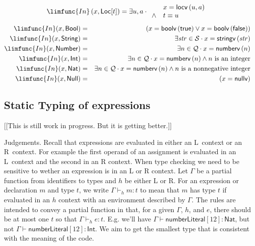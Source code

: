 \documentclass[12pt]{article}
\begin{document}
\begin{equation*}
\limfunc{In}\left( x,\mathsf{Loc}[t]\right) =\exists u,a\cdot 
\begin{array}{ll}
& x=\mathsf{locv}\left( u,a\right) \\ 
\wedge & t\equiv u%
\end{array}%
\end{equation*}%
\begin{eqnarray*}
\limfunc{In}(x,\mathsf{Bool}) &=&\left( x=\mathsf{boolv}\left( \mathsf{true}%
\right) \vee x=\mathsf{boolv}\left( \mathsf{false}\right) \right) \\
\limfunc{In}(x,\mathsf{String}) &=&\exists \mathit{str}\in \mathcal{S}\cdot
x=\mathsf{stringv}\left( \mathit{str}\right) \\
\limfunc{In}(x,\mathsf{Number}) &=&\exists n\in \mathcal{Q}\cdot x=\mathsf{%
numberv}\left( n\right) \\
\limfunc{In}(x,\mathsf{Int}) &=&\exists n\in \mathcal{Q}\cdot x=\mathsf{%
numberv}\left( n\right) \wedge n\text{ is an integer} \\
\limfunc{In}(x,\mathsf{Nat}) &=&\exists n\in \mathcal{Q}\cdot x=\mathsf{%
numberv}\left( n\right) \wedge n\text{ is a nonnegative integer} \\
\limfunc{In}(x,\mathsf{Null}) &=&\left( x=\mathsf{nullv}\right)
\end{eqnarray*}

\subsection{Static Typing of expressions}

[[This is still work in progress. But it is getting better.]]

Judgements. Recall that expressions are evaluated in either an L\ context or
an R\ context. For example the first operand of an assignment is evaluated
in an L\ context and the second in an R context. When type checking we need
to be sensitive to wether an expression is in an L or R context. Let $\Gamma 
$ be a partial function from identifiers to types and $h$ be either L or R.
For an expression or declaration $m$ and type $t$, we write $\Gamma \vdash
_{h}m:t$ to mean that $m$ has type $t$ if evaluated in an $h$ context with
an environment described by $\Gamma $. The rules are intended to convey a
partial function in that, for a given $\Gamma $, $h$, and $e$, there should
be at most one $t$ so that $\Gamma \vdash _{h}e:t$. E.g. we'll have $\Gamma
\vdash \mathsf{numberLiteral}[12]:\mathsf{Nat}$, but not $\Gamma \vdash 
\mathsf{numberLiteral}[12]:\mathsf{Int}$. We aim to get the smallest type
that is consistent with the meaning of the code.
\end{document}
